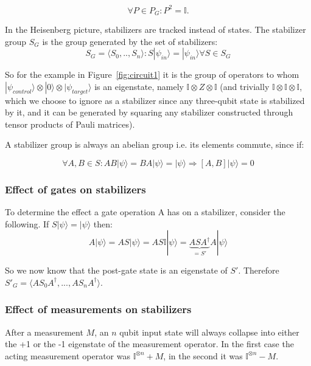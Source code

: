 \begin{equation}
    \forall P\in P_{G}: P^{2}=\mathbb{I}.
\end{equation}

In the Heisenberg picture, stabilizers are tracked instead of
states. 
The stabilizer group $S_{G}$ is the group generated by
the set of stabilizers:
\begin{equation}
	S_{G} = \langle S_{0},..,S_{n}\rangle: S|\psi_{in}\rangle = 
	|\psi_{in}\rangle \forall S \in S_{G}
\end{equation}

So for the example in Figure~\ref{fig:circuit1} it is the group
of operators to whom
$|\psi_{control}\rangle \otimes |0\rangle \otimes 
|\psi_{target}\rangle$ is an eigenstate, namely 
$\mathbb{I}\otimes Z \otimes \mathbb{I}$ (and trivially
$\mathbb{I}\otimes\mathbb{I}\otimes\mathbb{I}$, which we choose
to ignore as a stabilizer since any three-qubit state
is stabilized by it, and it can be generated by squaring any
stabilizer constructed through tensor products of Pauli matrices).

A stabilizer group is always an abelian group i.e. its elements 
 commute, since if:

\begin{equation}
	\label{abelian_stabilizers_equation}
	\forall A,B \in S: AB|\psi\rangle = BA|\psi\rangle = |\psi\rangle
	\Rightarrow [A,B]|\psi\rangle=0
\end{equation}

\subsubsection{Effect of gates on stabilizers}
To determine the effect a gate operation A has on a
stabilizer, consider the following.
If $S|\psi\rangle = |\psi\rangle$ then:
\begin{equation}
A|\psi\rangle = AS|\psi\rangle = AS\mathbb{I}|\psi\rangle
	= \underbrace{ASA^{\dagger}}_{=S'}A|\psi\rangle
\end{equation}

So we now know that the post-gate state is an eigenstate of $S'$.
Therefore $S'_{G} = \langle AS_{0}A^{\dagger},...,AS_{n}A^{\dagger}\rangle$.


\subsubsection{Effect of measurements on stabilizers}
After a measurement $M$, an $n$ qubit input state will always 
collapse into either the +1 or the -1 eigenstate of the 
measurement operator.
In the first case the acting measurement operator was 
$\mathbb{I}^{\otimes n}+M$, in the second it was
$\mathbb{I}^{\otimes n}-M$.

